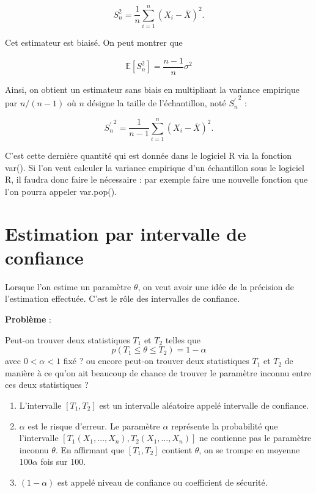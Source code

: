 \documentclass[]{book}
\providecommand{\tightlist}{%
  \setlength{\itemsep}{0pt}\setlength{\parskip}{0pt}}
\theoremstyle{definition}
\theoremstyle{definition}
\theoremstyle{remark}
\begin{document}
\[
S_n^2=\frac{1}{n}\displaystyle\sum_{i=1}^n(X_i-\bar X)^2 .
\]

Cet estimateur est biaisé. On peut montrer que

\[
\mathbb E [S_n^2] = \frac{n-1}{n} \sigma^2
\]

Ainsi, on obtient un estimateur sans biais en multipliant la variance
empirique par \(n/(n-1)\) où \(n\) désigne la taille de l'échantillon,
noté \({S_n^\prime}^2\) :

\[
{S^\prime_n}^2=\frac{1}{n-1}\displaystyle\sum_{i=1}^n(X_i-\bar X)^2 .
\]

C'est cette dernière quantité qui est donnée dans le logiciel R via la
fonction var(). Si l'on veut calculer la variance empirique d'un
échantillon sous le logiciel R, il faudra donc faire le nécessaire : par
exemple faire une nouvelle fonction que l'on pourra appeler var.pop().

\section{Estimation par intervalle de
confiance}\label{estimation-par-intervalle-de-confiance}

Lorsque l'on estime un paramètre \(\theta\), on veut avoir une idée de
la précision de l'estimation effectuée. C'est le rôle des intervalles de
confiance.

\textbf{Problème} :

Peut-on trouver deux statistiques \(T_1\) et \(T_2\) telles que
\[p(T_1\leq \theta\leq T_2)=1-\alpha\] avec \(0<\alpha<1\) fixé ? ou
encore peut-on trouver deux statistiques \(T_1\) et \(T_2\) de manière à
ce qu'on ait beaucoup de chance de trouver le paramètre inconnu entre
ces deux statistiques ?

\begin{enumerate}
\def\labelenumi{\arabic{enumi}.}
\tightlist
\item
  L'intervalle \([T_1, T_2]\) est un intervalle aléatoire appelé
  intervalle de confiance.
\item
  \(\alpha\) est le risque d'erreur. Le paramètre \(\alpha\) représente
  la probabilité que l'intervalle
  \([T_1(X_1,\ldots,X_n), T_2(X_1,\ldots,X_n)]\) ne contienne pas le
  paramètre inconnu \(\theta\). En affirmant que \([T_1, T_2]\) contient
  \(\theta\), on se trompe en moyenne 100\(\alpha\) fois sur 100.
\item
  \((1-\alpha)\) est appelé niveau de confiance ou coefficient de
  sécurité.
\end{enumerate}
\end{document}
